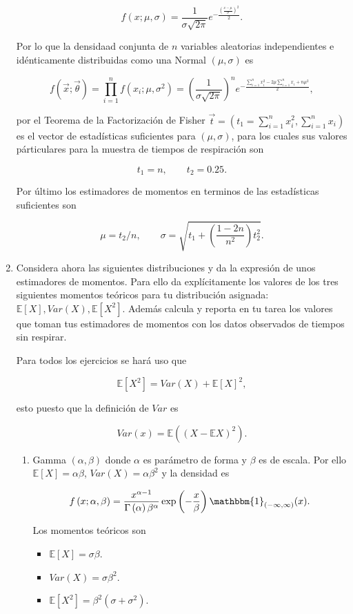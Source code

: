 \documentclass[letterpaper]{article}
\theoremstyle{definition}
\theoremstyle{lemathm}
\theoremstyle{lemathm}
\theoremstyle{lemathm}
\theoremstyle{lemademthm}
\newcommand{\pars}[1]{\left( #1 \right) }
\newcommand{\bracs}[1]{\left[ #1 \right] }
\newcommand{\EE}{\mathbb{E}}
\newcommand{\1}{\mathbbm{1}}
\begin{document}
\begin{enumerate}
		\[f\pars{x;\mu,\sigma} = \frac{1}{\sigma\sqrt{2\pi}} e^{-\frac{\pars{\frac{x-\mu}{\sigma}}^2}{2}}.\]

		Por lo que la densidaad conjunta de $n$ variables aleatorias independientes e idénticamente distribuidas como una Normal $(\mu,\sigma)$ es

		\[f\pars{\vec{x};\vec{\theta}} = \prod_{i=1}^n f\pars{x_i;\mu,\sigma^2} = \pars{\frac{1}{\sigma\sqrt{2\pi}}}^n e^{-\frac{\sum_{i=1}^n x_i^2 - 2\mu\sum_{i=1}^n x_i + n\mu^2}{2}},\]

		por el Teorema de la Factorización de Fisher $\vec{t} = (t_1 = \sum_{i=1}^n x_i^2, \sum_{i=1}^n x_i)$ es el vector de estadísticas suficientes para $\pars{\mu,\sigma}$, para los cuales sus valores párticulares para la muestra de tiempos de respiración son

		\[t_1 = n, \qquad t_2 = 0.25.\]

		Por último los estimadores de momentos en terminos de las estadísticas suficientes son

		\[\mu = t_2/n,\qquad \sigma = \sqrt{t_1+\pars{\frac{1-2n}{n^2}}t_2^2}.\]

		\item Considera ahora las siguientes distribuciones y da la expresión de unos estimadores de momentos. Para ello da explícitamente los valores de los tres siguientes momentos teóricos para tu distribución asignada: $\EE\bracs{X},Var\pars{X},\EE\bracs{X^2}.$ Además calcula y reporta en tu tarea los valores que toman tus estimadores de momentos con los datos observados de tiempos sin respirar.
		
		Para todos los ejercicios se hará uso que

		\[\EE\bracs{X^2} = Var\pars{X}+\EE\bracs{X}^2,\]

		esto puesto que la definición de $Var$ es

		\[Var\pars{x} = \EE\pars{\pars{X-\EE{X}}^2}.\]

		\begin{enumerate}
			\item Gamma $\pars{\alpha,\beta}$ donde $\alpha$ es parámetro de forma y $\beta$ es de escala. Por ello $\EE\bracs{X} = \alpha\beta$, $Var\pars{X} = \alpha\beta^2$ y la densidad es
			
			\[f\pars{x;\alpha,\beta} = \frac{x^{\alpha-1}}{\Gamma\pars{\alpha}\beta^{\alpha}} \exp\pars{-\frac{x}{\beta}}\1_{\pars{-\infty,\infty}}(x).\]

			Los momentos teóricos son

			\begin{itemize}
				\item $\EE\bracs{X} = \sigma\beta$.
				\item $Var\pars{X} = \sigma\beta^2$.
				\item $\EE\bracs{X^2} = \beta^2\pars{\sigma + \sigma^2}$.
			\end{itemize}


\end{enumerate}
\end{enumerate}
\end{document}
